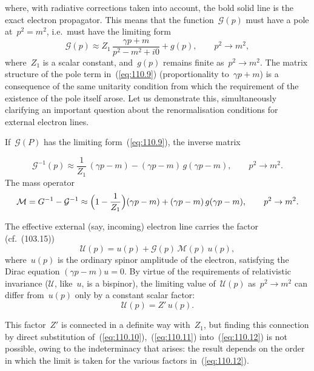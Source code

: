 \noindent where, with radiative corrections taken into account, the bold solid line is the exact electron propagator. This means that the function~$\mathcal{G}(p)$ must have a pole at~$p^2 = m^2$, i.e.\ must have the limiting form
\begin{equation}
\mathcal{G}(p) \approx Z_1\,\frac{\gamma p + m}{p^2 - m^2 + i0} + g(p), \qquad p^2 \to m^2,
\label{eq:110.9}
\end{equation}
where~$Z_1$ is a scalar constant, and~$g(p)$ remains finite as~$p^2 \to m^2$. The matrix structure of the pole term in~(\ref{eq:110.9}) (proportionality to~$\gamma p + m$) is a consequence of the same unitarity condition from which the requirement of the existence of the pole itself arose. Let us demonstrate this, simultaneously clarifying an important question about the renormalisation conditions for external electron lines.

If~$\mathcal{G}(P)$ has the limiting form~(\ref{eq:110.9}), the inverse matrix


\begin{equation}
\mathcal{G}^{-1}(p) \approx \frac{1}{Z_1}\,(\gamma p - m) - (\gamma p - m)\,g(\gamma p - m), \qquad p^2 \to m^2.
\label{eq:110.10}
\end{equation}
The mass operator
\begin{equation}
\mathcal{M} = G^{-1} - \mathcal{G}^{-1} \approx \Bigl(1 - \frac{1}{Z_1}\Bigr)(\gamma p - m) + (\gamma p - m)\,g(\gamma p - m), \qquad p^2 \to m^2.
\label{eq:110.11}
\end{equation}

The effective external (say, incoming) electron line carries the factor (cf.~(103.15))
\begin{equation}
\mathcal{U}(p) = u(p) + \mathcal{G}(p)\,\mathcal{M}(p)\,u(p),
\label{eq:110.12}
\end{equation}
where~$u(p)$ is the ordinary spinor amplitude of the electron, satisfying the Dirac equation $(\gamma p - m)u = 0$. By virtue of the requirements of relativistic invariance ($\mathcal{U}$, like~$u$, is a bispinor), the limiting value of~$\mathcal{U}(p)$ as~$p^2 \to m^2$ can differ from~$u(p)$ only by a constant scalar factor:
\begin{equation}
\mathcal{U}(p) = Z'\,u(p).
\label{eq:110.13}
\end{equation}

This factor~$Z'$ is connected in a definite way with~$Z_1$, but finding this connection by direct substitution of~(\ref{eq:110.10}),~(\ref{eq:110.11}) into~(\ref{eq:110.12}) is not possible, owing to the indeterminacy that arises: the result depends on the order in which the limit is taken for the various factors in~(\ref{eq:110.12}).

